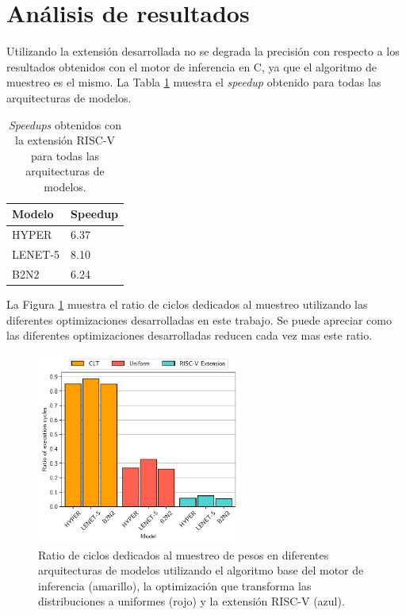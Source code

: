 
\section{Análisis de resultados}

Utilizando la extensión desarrollada no se degrada la precisión con respecto a los resultados obtenidos con el motor de inferencia en C, ya que el algoritmo de muestreo es el mismo. La Tabla \ref{tab:riscv_speedup} muestra el \textit{speedup} obtenido para todas las arquitecturas de modelos.

\begin{table}[h]
    \centering
    \caption{\textit{Speedups} obtenidos con la extensión RISC-V para todas las arquitecturas de modelos.}
    \label{tab:riscv_speedup}
    \begin{tabular}{ll}
    \hline
     \textbf{Modelo}& \textbf{Speedup} \\ \hline
    HYPER& 6.37\\
    LENET-5& 8.10\\
    B2N2& 6.24\\ \hline
    \end{tabular}
\end{table}

La Figura \ref{fig:ratio_all} muestra el ratio de ciclos dedicados al muestreo utilizando las diferentes optimizaciones desarrolladas en este trabajo. Se puede apreciar como las diferentes optimizaciones desarrolladas reducen cada vez mas este ratio.

\begin{figure}[h]
    \centering
    \includegraphics[width=0.6\textwidth]{root/Imagenes/5_riscv/ratio_all.pdf}
    \caption{Ratio de ciclos dedicados al muestreo de pesos en diferentes arquitecturas de modelos utilizando el algoritmo base del motor de inferencia (amarillo), la optimización que transforma las distribuciones a uniformes (rojo) y la extensión RISC-V (azul).}
    \label{fig:ratio_all}
\end{figure}


